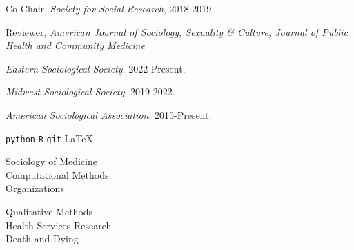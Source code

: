 \documentclass[11pt,article,oneside]{memoir}
\begin{document}
\ind Co-Chair, \emph{Society for Social Research}, 2018-2019.

\ind Reviewer, \emph{American Journal of Sociology, Sexuality \& Culture, Journal of Public Health and Community Medicine}

\medskip
{}
\medskip

\ind \emph{Eastern Sociological Society}. 2022-Present.

\ind \emph{Midwest Sociological Society}. 2019-2022.

\ind \emph{American Sociological Association}. 2015-Present.

\bigskip
{}

\medskip

\ind \texttt{python} \hspace{0.4in}  \texttt{R} \hspace{0.4in} \texttt{git} \hspace{0.4in} \LaTeX

\medskip
{}
\bigskip

\vskip 25pt

\begin{minipage}{\textwidth}
	\begin{minipage}{0.48\textwidth}
	Sociology of Medicine \\ Computational Methods \\ Organizations
	\end{minipage}\hfill
	\begin{minipage}{0.52\textwidth}
	Qualitative Methods \\ Health Services Research \\ Death and Dying
	\end{minipage}%
\end{minipage}

\bigskip
{}
\bigskip
\end{document}
